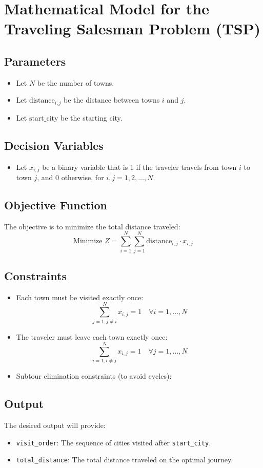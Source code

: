 \documentclass{article}
\begin{document}
\section*{Mathematical Model for the Traveling Salesman Problem (TSP)}

\subsection*{Parameters}
\begin{itemize}
    \item Let \( N \) be the number of towns.
    \item Let \( \text{distance}_{i,j} \) be the distance between towns \( i \) and \( j \).
    \item Let \( \text{start\_city} \) be the starting city.
\end{itemize}

\subsection*{Decision Variables}
\begin{itemize}
    \item Let \( x_{i,j} \) be a binary variable that is 1 if the traveler travels from town \( i \) to town \( j \), and 0 otherwise, for \( i, j = 1, 2, \ldots, N \).
\end{itemize}

\subsection*{Objective Function}
The objective is to minimize the total distance traveled:
\[
\text{Minimize } Z = \sum_{i=1}^{N} \sum_{j=1}^{N} \text{distance}_{i,j} \cdot x_{i,j}
\]

\subsection*{Constraints}
\begin{itemize}
    \item Each town must be visited exactly once:
    \[
    \sum_{j=1, j \neq i}^{N} x_{i,j} = 1 \quad \forall i = 1, \ldots, N
    \]
    \item The traveler must leave each town exactly once:
    \[
    \sum_{i=1, i \neq j}^{N} x_{i,j} = 1 \quad \forall j = 1, \ldots, N
    \]
    \item Subtour elimination constraints (to avoid cycles):
    \end{itemize}

\subsection*{Output}
The desired output will provide:
\begin{itemize}
    \item \texttt{visit\_order}: The sequence of cities visited after \texttt{start\_city}.
    \item \texttt{total\_distance}: The total distance traveled on the optimal journey.
\end{itemize}
\end{document}

